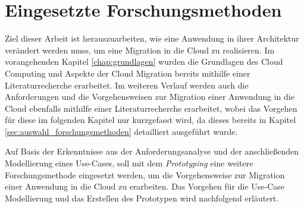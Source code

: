 \chapter{Eingesetzte Forschungsmethoden}
\label{chap:forschungsmethoden}
Ziel dieser Arbeit ist herauszuarbeiten, wie eine Anwendung in ihrer Architektur verändert werden muss, um eine Migration in die Cloud zu realisieren. Im vorangehenden Kapitel \ref{chap:grundlagen} wurden die Grundlagen des Cloud Computing und Aspekte der Cloud Migration bereits mithilfe einer Literaturrecherche erarbeitet. Im weiteren Verlauf werden auch die Anforderungen und die Vorgehensweisen zur Migration einer Anwendung in die Cloud ebenfalls mithilfe einer Literaturrecherche erarbeitet, wobei das Vorgehen für diese im folgenden Kapitel nur kurzgefasst wird, da dieses bereits in Kapitel \ref{sec:auswahl_forschungsmethoden} detailliert ausgeführt wurde.

Auf Basis der Erkenntnisse aus der Anforderungsanalyse und der anschließenden Modellierung eines Use-Cases, soll mit dem \textit{Prototyping} eine weitere Forschungsmethode eingesetzt werden, um die Vorgehensweise zur Migration einer Anwendung in die Cloud zu erarbeiten. Das Vorgehen für die Use-Case Modellierung und das Erstellen des Prototypen wird nachfolgend erläutert.


% 

